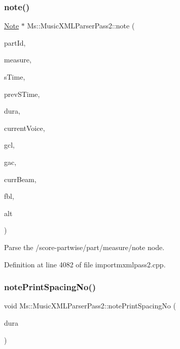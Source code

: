 \subsubsection{\texorpdfstring{note()}{note()}}
{\footnotesize\ttfamily \hyperlink{class_ms_1_1_note}{Note} $\ast$ Ms\+::\+Music\+X\+M\+L\+Parser\+Pass2\+::note (\begin{DoxyParamCaption}\item[{const Q\+String \&}]{part\+Id,  }\item[{\hyperlink{class_ms_1_1_measure}{Measure} $\ast$}]{measure,  }\item[{const \hyperlink{class_ms_1_1_fraction}{Fraction}}]{s\+Time,  }\item[{const \hyperlink{class_ms_1_1_fraction}{Fraction}}]{prev\+S\+Time,  }\item[{\hyperlink{class_ms_1_1_fraction}{Fraction} \&}]{dura,  }\item[{Q\+String \&}]{current\+Voice,  }\item[{Grace\+Chord\+List \&}]{gcl,  }\item[{int \&}]{gac,  }\item[{\hyperlink{class_ms_1_1_beam}{Beam} $\ast$\&}]{curr\+Beam,  }\item[{Figured\+Bass\+List \&}]{fbl,  }\item[{int \&}]{alt }\end{DoxyParamCaption})}

Parse the /score-\/partwise/part/measure/note node. 

Definition at line 4082 of file importmxmlpass2.\+cpp.

\mbox{\label{class_ms_1_1_music_x_m_l_parser_pass2_a6aca58f758354d164ddcffbf7ad64fdd}} 
\subsubsection{\texorpdfstring{note\+Print\+Spacing\+No()}{notePrintSpacingNo()}}
{\footnotesize\ttfamily void Ms\+::\+Music\+X\+M\+L\+Parser\+Pass2\+::note\+Print\+Spacing\+No (\begin{DoxyParamCaption}\item[{\hyperlink{class_ms_1_1_fraction}{Fraction} \&}]{dura }\end{DoxyParamCaption})}

